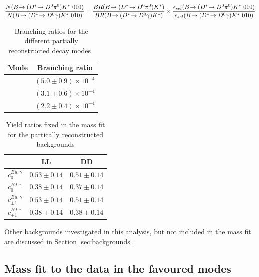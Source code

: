 \begin{equation}
\frac{N(\decay{\B}{(\decay{\Dstar}{\Dz\piz})\Kstar}\ 010)}{N(\decay{\B}{(\decay{\Dstar}{\Dz\gamma})\Kstar}\ 010)} = \frac{BR(\decay{\B}{(\decay{\Dstar}{\Dz\piz})\Kstar})}{BR(\decay{\B}{(\decay{\Dstar}{\Dz\gamma})\Kstar})} \times \frac{\epsilon_{sel}(\decay{\B}{(\decay{\Dstar}{\Dz\piz})\Kstar}\ 010)}{\epsilon_{sel}(\decay{\B}{(\decay{\Dstar}{\Dz\gamma})\Kstar}\ 010)}
\label{partrecoexample}
\end{equation}

\begin{table}[h]
\centering
\begin{tabular}{c|c}
Mode & Branching ratio \\
\hline
\decay{\Bm}{(\decay{\Dstarz}{\Dz[\piz]})\Kstarm} & $(5.0 \pm 0.9) \times 10^{-4}$ \\
\decay{\Bm}{(\decay{\Dstarz}{\Dz[\gamma]})\Kstarm} & $(3.1 \pm 0.6) \times 10^{-4}$ \\
\decay{\Bd}{(\decay{\Dstarp}{\Dz[\pip]})\Kstarm} & $(2.2 \pm 0.4) \times 10^{-4}$ \\
\end{tabular}
\caption{Branching ratios for the different partially reconstructed decay modes~\cite{PDG2014}}
\label{partrecoBRs}
\end{table}

\begin{table}[h]
\centering
\begin{tabular}{ccc}
\hline
& LL & DD \\
\hline
$c^{Bu,\gamma}_0$ & $0.53 \pm 0.14$ & $0.51 \pm 0.14$ \\[3mm]
$c^{Bd,\pi}_0$ & $0.38 \pm 0.14$ & $0.37 \pm 0.14$ \\[3mm]
$c^{Bu,\gamma}_{\pm 1}$ & $0.53 \pm 0.14$ & $0.51 \pm 0.14$ \\[3mm]
$c^{Bd,\pi}_{\pm 1}$ & $0.38 \pm 0.14$ & $0.38 \pm 0.14$ \\[3mm]
\hline
\end{tabular}
\caption{Yield ratios fixed in the mass fit for the partically reconstructed backgrounds}
\label{fixedyieldratios}
\end{table}

Other backgrounds investigated in this analysis, but not included in the mass fit are discussed in Section \ref{sec:backgrounds}.


\subsection{Mass fit to the data in the favoured modes}
\label{sec:massfit:fit}

